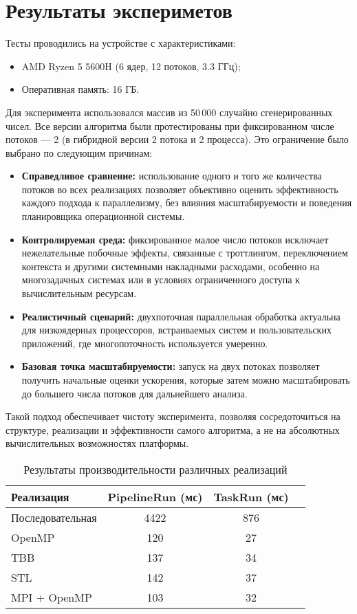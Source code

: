 \documentclass[a4paper,12pt]{article}
\begin{document}
\newpage
\section{Результаты экспериметов}
Тесты проводились на устройстве с характеристиками:

\begin{itemize}
    \item AMD Ryzen 5 5600H (6 ядер, 12 потоков, 3.3 ГГц);
    \item Оперативная память: 16 ГБ.
\end{itemize}

Для эксперимента использовался массив из 50\,000 случайно сгенерированных чисел. Все версии алгоритма были протестированы при фиксированном числе потоков — 2 (в гибридной версии 2 потока и 2 процесса). Это ограничение было выбрано по следующим причинам:
\begin{itemize}
    \item \textbf{Справедливое сравнение:} использование одного и того же количества потоков во всех реализациях позволяет объективно оценить эффективность каждого подхода к параллелизму, без влияния масштабируемости и поведения планировщика операционной системы.

    \item \textbf{Контролируемая среда:} фиксированное малое число потоков исключает нежелательные побочные эффекты, связанные с троттлингом, переключением контекста и другими системными накладными расходами, особенно на многозадачных системах или в условиях ограниченного доступа к вычислительным ресурсам.

    \item \textbf{Реалистичный сценарий:} двухпоточная параллельная обработка актуальна для низкоядерных процессоров, встраиваемых систем и пользовательских приложений, где многопоточность используется умеренно.

    \item \textbf{Базовая точка масштабируемости:} запуск на двух потоках позволяет получить начальные оценки ускорения, которые затем можно масштабировать до большего числа потоков для дальнейшего анализа.
\end{itemize}

Такой подход обеспечивает чистоту эксперимента, позволяя сосредоточиться на структуре, реализации и эффективности самого алгоритма, а не на абсолютных вычислительных возможностях платформы.
\bigskip
\begin{table}[h!]
\centering
\caption{Результаты производительности различных реализаций}
\begin{tabular}{|l|c|c|c|}
\hline
\textbf{Реализация} & \textbf{PipelineRun (мс)} & \textbf{TaskRun (мс)} \\
\hline
Последовательная & 4422 & 876  \\
OpenMP           & 120  & 27 \\
TBB              & 137  & 34 \\
STL              & 142  & 37 \\
MPI + OpenMP     & 103  & 32 \\
\hline
\end{tabular}
\label{tab:results}
\end{table}
\newpage
\end{document}
